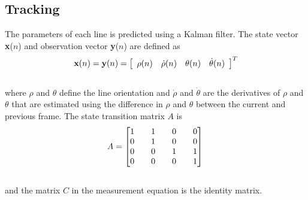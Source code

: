 \documentclass{article}
\begin{document}
\subsection{Tracking}
The parameters of each line is predicted using a Kalman filter.
The state vector \textbf{x}($n$) and observation vector \textbf{y}($n$) are defined as
\begin{equation}
    {\bf x}(n)= {\bf y}(n)
     = \left[ \begin{array}{cccc}
        \rho (n) & \dot{\rho}(n) & \theta (n) & \dot{\theta}(n)
        \end{array} \right]^T
\label{eq:state_measure_vectors}
\end{equation}\\
where $\rho$ and $\theta$ define the line orientation and $\dot{\rho}$ and $\dot{\theta}$ are the derivatives of $\rho$ and $\theta$ that are estimated using the difference in $\rho $ and $\theta $ between the current and previous frame.
The state transition matrix $A$ is
\begin{equation}
A = \begin{bmatrix} 1 && 1 && 0 && 0 \\ 0 && 1 && 0 && 0 \\ 0 && 0 && 1 && 1 \\ 0 && 0 && 0 && 1 \\\end{bmatrix}\\
\label{eq:state_trans}
\end{equation}\\
and the matrix $C$ in the measurement equation is the identity matrix.
\end{document}
